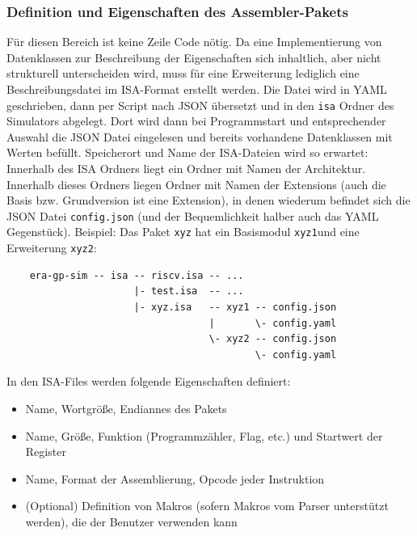 \subsubsection{Definition und Eigenschaften des Assembler-Pakets}
Für diesen Bereich ist keine Zeile Code nötig. Da eine Implementierung von Datenklassen zur Beschreibung der Eigenschaften sich inhaltlich, aber nicht strukturell unterscheiden wird, muss für eine Erweiterung lediglich eine Beschreibungsdatei im ISA-Format erstellt werden. Die Datei wird in YAML geschrieben, dann per Script nach JSON übersetzt und in den \texttt{isa} Ordner des Simulators abgelegt. Dort wird dann bei Programmstart und entsprechender Auswahl die JSON Datei eingelesen und bereits vorhandene Datenklassen mit Werten befüllt. Speicherort und Name der ISA-Dateien wird so erwartet: Innerhalb des ISA Ordners liegt ein Ordner mit Namen der Architektur. Innerhalb dieses Ordners liegen Ordner mit Namen der Extensions (auch die Basis bzw. Grundversion ist eine Extension), in denen wiederum befindet sich die JSON Datei \texttt{config.json} (und der Bequemlichkeit halber auch das YAML Gegenstück). Beispiel: Das Paket \texttt{xyz} hat ein Basismodul \texttt{xyz1}und eine Erweiterung \texttt{xyz2}:
\begin{lstlisting}
	era-gp-sim -- isa -- riscv.isa -- ...
	                  |- test.isa  -- ...
	                  |- xyz.isa   -- xyz1 -- config.json
	                               |       \- config.yaml
	                               \- xyz2 -- config.json
	                                       \- config.yaml
\end{lstlisting}
In den ISA-Files werden folgende Eigenschaften definiert:
\begin{itemize}
	\item Name, Wortgröße, Endiannes des Pakets
	\item Name, Größe, Funktion (Programmzähler, Flag, etc.) und Startwert der Register
	\item Name, Format der Assemblierung, Opcode jeder Instruktion
	\item (Optional) Definition von Makros (sofern Makros vom Parser unterstützt werden), die der Benutzer verwenden kann
\end{itemize}

